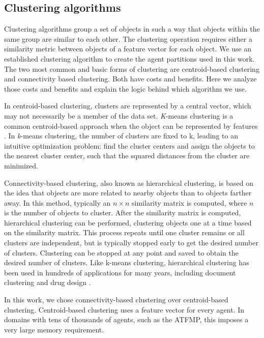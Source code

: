 \documentclass[smallcondensed]{svjour3}
\begin{document}
\subsection{Clustering algorithms}
Clustering algorithms group a set of objects in such a way that objects within the same group are similar to each other. The clustering operation requires either a similarity metric between objects of a feature vector for each object. We use an established clustering algorithm to create the agent partitions used in this work. The two most common and basic forms of clustering are centroid-based clustering and connectivity based clustering. Both have costs and benefits. Here we analyze those costs and benefits and explain the logic behind which algorithm we use.  

In centroid-based clustering, clusters are represented by a central vector, which may not necessarily be a member of the data set. \textit{K}-means clustering is a common centroid-based approach when the object can be represented by features \cite{Jain:2010:DCY:1755267.1755654}. In \textit{k}-means clustering, the number of clusters are fixed to k, leading to an intuitive optimization problem: find the cluster centers and assign the objects to the nearest cluster center, such that the squared distances from the cluster are minimized.

Connectivity-based clustering, also known as hierarchical clustering, is based on the idea that objects are more related to nearby objects than to objects farther away. In this method, typically an $n\times n$ similarity matrix is computed, where $n$ is the number of objects to cluster. After the similarity matrix is computed, hierarchical clustering can be performed, clustering objects one at a time based on the similarity matrix. This process repeats until one cluster remains or all clusters are independent, but is typically stopped early to get the desired number of clusters. Clustering can be stopped at any point and saved to obtain the desired number of clusters. Like k-means clustering, hierarchical clustering has been used in hundreds of applications for many years, including document clustering \cite{Zhao:2002:EHC:584792.584877} and drug design \cite{Bottegoni15072006}.

In this work, we chose connectivity-based clustering over centroid-based clustering. Centroid-based clustering uses a feature vector for every agent. In domains with tens of thousands of agents, such as the ATFMP, this imposes a very large memory requirement.
 
\end{document}
